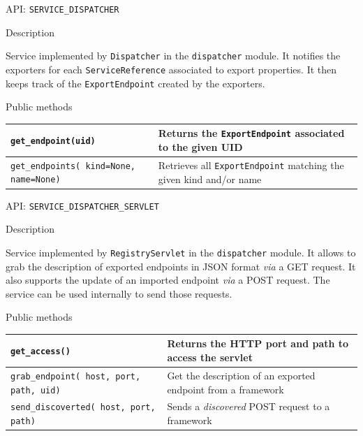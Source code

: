 \begin{frame}{API: \texttt{SERVICE\_DISPATCHER}}
\begin{block}{Description}
\begin{small}
Service implemented by \texttt{Dispatcher} in the \texttt{dispatcher} module.
It notifies the exporters for each \texttt{ServiceReference} associated to export properties.
It then keeps track of the \texttt{ExportEndpoint} created by the exporters.
\end{small}
\end{block}

\begin{block}{Public methods}
\begin{small}
\begin{tabular}{p{13em} p{}}
\texttt{get\_endpoint(uid)} & Returns the \texttt{ExportEndpoint} associated to the given UID \\
\hline
\texttt{get\_endpoints( kind=None, name=None)} & Retrieves all \texttt{ExportEndpoint} matching the given kind and/or name \\
\end{tabular}
\end{small}
\end{block}
\end{frame}

\begin{frame}{API: \texttt{SERVICE\_DISPATCHER\_SERVLET}}
\begin{block}{Description}
\begin{small}
Service implemented by \texttt{RegistryServlet} in the \texttt{dispatcher} module.
It allows to grab the description of exported endpoints in JSON format \textit{via} a GET request.
It also supports the update of an imported endpoint \textit{via} a POST request.
The service can be used internally to send those requests.
\end{small}
\end{block}

\begin{block}{Public methods}
\begin{small}
\begin{tabular}{p{} p{}}
\texttt{get\_access()} & Returns the HTTP port and path to access the servlet \\
\hline
\texttt{grab\_endpoint( host, port, path, uid)} & Get the description of an exported endpoint from a framework\\
\hline
\texttt{send\_discoverted( host, port, path)} & Sends a \textit{discovered} POST request to a framework \\
\end{tabular}
\end{small}
\end{block}
\end{frame}

